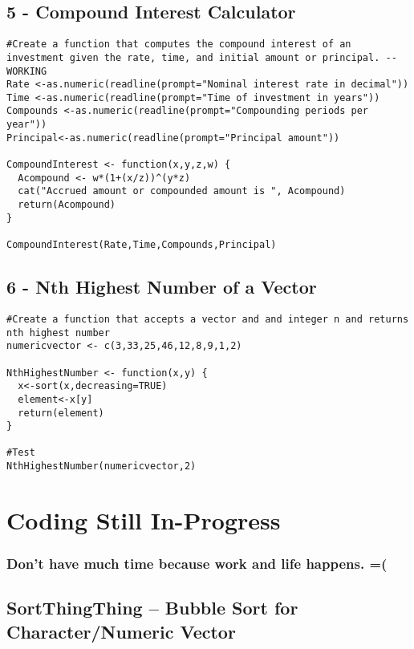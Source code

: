 \documentclass[]{article}
\begin{document}
\subsection{5 - Compound Interest
Calculator}\label{compound-interest-calculator}

\begin{verbatim}
#Create a function that computes the compound interest of an investment given the rate, time, and initial amount or principal. -- WORKING
Rate <-as.numeric(readline(prompt="Nominal interest rate in decimal"))
Time <-as.numeric(readline(prompt="Time of investment in years"))
Compounds <-as.numeric(readline(prompt="Compounding periods per year"))
Principal<-as.numeric(readline(prompt="Principal amount"))

CompoundInterest <- function(x,y,z,w) {
  Acompound <- w*(1+(x/z))^(y*z)
  cat("Accrued amount or compounded amount is ", Acompound)
  return(Acompound)
}

CompoundInterest(Rate,Time,Compounds,Principal)
\end{verbatim}

\subsection{6 - Nth Highest Number of a
Vector}\label{nth-highest-number-of-a-vector}

\begin{verbatim}
#Create a function that accepts a vector and and integer n and returns nth highest number
numericvector <- c(3,33,25,46,12,8,9,1,2)

NthHighestNumber <- function(x,y) {
  x<-sort(x,decreasing=TRUE)
  element<-x[y]
  return(element)
}

#Test
NthHighestNumber(numericvector,2)
\end{verbatim}

\section{Coding Still In-Progress}\label{coding-still-in-progress}

\subsubsection{Don't have much time because work and life happens.
=(}\label{dont-have-much-time-because-work-and-life-happens.}

\subsection{SortThingThing -- Bubble Sort for Character/Numeric
Vector}\label{sortthingthing-bubble-sort-for-characternumeric-vector}
\end{document}
